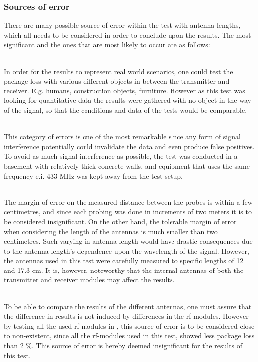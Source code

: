 \subsubsection*{Sources of error}
There are many possible source of error within the test with antenna lengths, which all needs to be considered in order to conclude upon the results.
The most significant and the ones that are most likely to occur are as follows:
\begin{description}[labelindent=\parindent]
    \item[Objects placed in the way of the signal] \hfill \\
    In order for the results to represent real world scenarios, one could test the package loss with various different objects in between the transmitter and receiver. 
    E.g. humans, construction objects, furniture.
    However as this test was looking for quantitative data the results were gathered with no object in the way of the signal, so that the conditions and data of the tests would be comparable.
    \item[Signal interference] \hfill \\
    This category of errors is one of the most remarkable since any form of signal interference potentially could invalidate the data and even produce false positives.
    To avoid as much signal interference as possible, the test was conducted in a basement with relatively thick concrete walls, and equipment that uses the same frequency e.i. 433 MHz was kept away from the test setup.
    \item[Inaccuracy in distance and antenna length] \hfill \\
    The margin of error on the measured distance between the probes is within a few centimetres, and since each probing was done in increments of two meters it is to be considered insignificant.
    On the other hand, the tolerable margin of error when considering the length of the antennas is much smaller than two centimetres.
    Such varying in antenna length would have drastic consequences due to the antenna length's dependence upon the wavelength of the signal.
    However, the antennas used in this test were carefully measured to specific lengths of 12 and 17.3 cm.
    It is, however, noteworthy that the internal antennas of both the transmitter and receiver modules may affect the results.
    \item[Difference in \acrshort{rf}-modules] \hfill \\
    To be able to compare the results of the different antennas, one must assure that the difference in results is not induced by differences in the \gls{rf}-modules.
    However by testing all the used \gls{rf}-modules in , this source of error is to be considered close to non-existent, since all the \gls{rf}-modules used in this test, showed less package loss than 2 \%.
    This source of error is hereby deemed insignificant for the results of this test.
\end{description}


